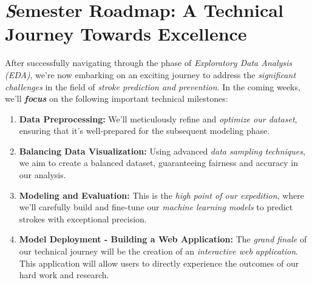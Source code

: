 \documentclass{article}
\begin{document}
\section{{\textit{\fontsize{18}{30}\selectfont S}emester Roadmap: A Technical Journey Towards Excellence}}

After successfully navigating through the phase of \textit{Exploratory Data Analysis (EDA)}, we're now embarking on an exciting journey to address the \textit{significant challenges} in the field of \textit{stroke prediction and prevention}. In the coming weeks, we'll \textbf{\textit{focus}} on the following important technical milestones:

\begin{enumerate}
    \item \textbf{Data Preprocessing:} We'll meticulously refine and \textit{optimize our dataset}, ensuring that it's well-prepared for the subsequent modeling phase.
    
    \item \textbf{Balancing Data Visualization:} Using advanced \textit{data sampling techniques}, we aim to create a balanced dataset, guaranteeing fairness and accuracy in our analysis.
    
    \item \textbf{Modeling and Evaluation:} This is the \textit{high point of our expedition}, where we'll carefully build and fine-tune our \textit{machine learning models} to predict strokes with exceptional precision.
    
    \item \textbf{Model Deployment - Building a Web Application:} The \textit{grand finale} of our technical journey will be the creation of an \textit{interactive web application}. This application will allow users to directly experience the outcomes of our hard work and research.
\end{enumerate}
\end{document}
